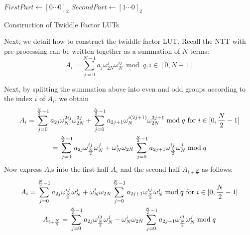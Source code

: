 \documentclass{iacrtrans}
\theoremstyle{plain}
\begin{document}
\begin{algorithm}[!tbh]
 \DontPrintSemicolon %
    $FirstPart \gets [0\cdots0]_2$\;{}
    $SecondPart \gets [1\cdots0]_2$\;
 \caption{Construction of Twiddle Factor LUTs}\label{alg:descript_twiddlefactor}
\end{algorithm}

Next, we detail how to construct the twiddle factor LUT. Recall the NTT with pre-processing can be written together as a summation of $N$ terms:
\[
    A_i = \sum_{j=0}^{N-1}a_j\omega_{2N}^j\omega_N^{ij} \bmod q, i\in [0,N-1]
\]

Next, by splitting the summation above into even and odd groups according to the index $i$ of $A_i$, we obtain
\begin{gather}
    A_i = \sum_{j=0}^{\frac{N}{2}-1}a_{2j}\omega_N^{2ij}\omega_{2N}^{2j}  + \sum_{j=0}^{\frac{N}{2}-1}a_{2j+1}\omega_N^{i(2j+1)}\omega_{2N}^{2j+1} \bmod q \text{ for } i\in [0,\frac{N}{2}-1]\notag\\
    = \sum_{j=0}^{\frac{N}{2}-1}a_{2j}\omega_{\frac{N}{2}}^{ij}\omega_{N}^{j}  + \omega_{N}^i\omega_{2N}\sum_{j=0}^{\frac{N}{2}-1}a_{2j+1}\omega_{\frac{N}{2}}^{ij}\omega_N^{j} \bmod q \notag
\end{gather}
Now express $A_i$s into the first half $A_{i}$ and the second half $A_{i+\frac{N}{2}}$ as follows: 
\begin{gather}
    A_i = \sum_{j=0}^{\frac{N}{2}-1}a_{2j}\omega_{\frac{N}{2}}^{ij}\omega_{N}^{j}  + \omega_{N}^i\omega_{2N}\sum_{j=0}^{\frac{N}{2}-1}a_{2j+1}\omega_{\frac{N}{2}}^{ij}\omega_N^{j} \bmod q \text{ for } i\in [0,\frac{N}{2}-1]\notag\\
   A_{i+\frac{N}{2}} = \sum_{j=0}^{\frac{N}{2}-1}a_{2j}\omega_{\frac{N}{2}}^{ij}\omega_{N}^{j}  - \omega_{N}^i\omega_{2N}\sum_{j=0}^{\frac{N}{2}-1}a_{2j+1}\omega_{\frac{N}{2}}^{ij}\omega_N^{j} \bmod q \notag
\end{gather}
\end{document}

